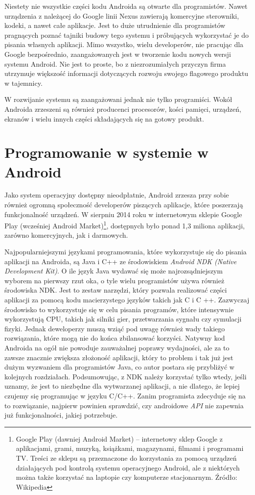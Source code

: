 Niestety nie wszystkie części kodu Androida są otwarte dla programistów. Nawet urządzenia z należącej do Google linii Nexus zawierają komercyjne sterowniki, kodeki, a nawet całe aplikacje. Jest to duże utrudnienie dla programistów pragnących poznać tajniki budowy tego systemu i próbujących wykorzystać je do pisania własnych aplikacji. Mimo wszystko, wielu developerów, nie pracując dla Google bezpośrednio, zaangażowanych jest w tworzenie kodu nowych wersji systemu Android. Nie jest to proste, bo z niezrozumiałych przyczyn firma utrzymuje większość informacji dotyczących rozwoju swojego flagowego produktu w tajemnicy.

W rozwijanie systemu są zaangażowani jednak nie tylko programiści. Wokół Androida zrzeszeni są również producenci procesorów, kości pamięci, urządzeń, ekranów i wielu innych części składających się na gotowy produkt.

\section{Programowanie w systemie w Android}
Jako system operacyjny dostępny nieodpłatnie, Android zrzesza przy sobie również ogromną społeczność developerów piszących aplikacje, które poszerzają funkcjonalność urządzeń. W sierpniu 2014 roku w internetowym sklepie Google Play (wcześniej Android Market)\footnote{Google Play (dawniej Android Market) – internetowy sklep Google z aplikacjami, grami, muzyką, książkami, magazynami, filmami i programami TV. Treści ze sklepu są przeznaczone do korzystania za pomocą urządzeń działających pod kontrolą systemu operacyjnego Android, ale z niektórych można także korzystać na laptopie czy komputerze stacjonarnym. Źródło: Wikipedia}, dostępnych było ponad 1,3 miliona aplikacji, zarówno komercyjnych, jak i darmowych.

Najpopularniejszymi językami programowania, które wykorzystuje się do pisania aplikacji na Androida, są Java i C++ ze środowiskiem \textit{Android NDK (Native Development Kit)}. O ile język Java wydawać się może najrozsądniejszym wyborem na pierwszy rzut oka, o tyle wielu programistów używa również środowiska NDK. Jest to zestaw narzędzi, który pozwala realizować części aplikacji za pomocą kodu macierzystego języków takich jak C i C ++. Zazwyczaj środowisko to wykorzystuje się w celu pisania programów, które intensywnie wykorzystują CPU, takich jak silniki gier, przetwarzania sygnału czy symulacji fizyki. Jednak deweloperzy muszą wziąć pod uwagę również wady takiego rozwiązania, które mogą nie do końca zbilansować korzyści. Natywny kod Androida na ogół nie powoduje zauważalnej poprawy wydajności, ale za to zawsze znacznie zwiększa złożoność aplikacji, który to problem i tak już jest dużym wyzwaniem dla programistów Java, co autor postara się przybliżyć w kolejnych rozdziałach. Podsumowując, z NDK należy korzystać tylko wtedy, jeśli uznamy, że jest to niezbędne dla wytwarzanej aplikacji, a nie dlatego, że lepiej czujemy się programując w języku C/C++. Zanim programista zdecyduje się na to rozwiązanie, najpierw powinien sprawdzić, czy androidowe \textit{API} nie zapewnia już funkcjonalności, jakiej potrzebuje.

